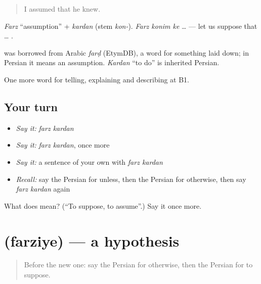 \begin{quote}
I assumed that he knew.
\end{quote}

\emph{Farz} \textquotedblleft{}assumption\textquotedblright{} + \emph{kardan} (stem \emph{kon-}). \emph{Farz konim ke} … — let us suppose that … .

\begin{cousinweb}
\textbf{} was borrowed from Arabic \emph{farḍ} (EtymDB), a word for something laid down; in Persian it means an assumption. \emph{Kardan} \textquotedblleft{}to do\textquotedblright{} is inherited Persian.
\end{cousinweb}

\begin{grammarlens}[title={What you've built}]
One more word for telling, explaining and describing at B1.
\end{grammarlens}

\subsection*{Your turn}
\begin{itemize}
\raggedright
  \item \emph{Say it:} \emph{farz kardan}
  \item \emph{Say it:} \emph{farz kardan}, once more
  \item \emph{Say it:} a sentence of your own with \emph{farz kardan}
  \item \emph{Recall:} say the Persian for unless, then the Persian for otherwise, then say \emph{farz kardan} again
\end{itemize}

\begin{tcolorbox}[breakable,colback=teal!4,colframe=teal!35!black,title={Before you move on}]
What does   mean? (\textquotedblleft{}To suppose, to assume\textquotedblright{}.) Say it once more.
\end{tcolorbox}
\section[\texorpdfstring{\fa{فرضیه} (farziye)}{فرضیه (farziye)}]{ (farziye) — a hypothesis}

\label{lesson:FA-C391-farziye}



\begin{quote}
Before the new one: say the Persian for otherwise, then the Persian for to suppose.
\end{quote}

